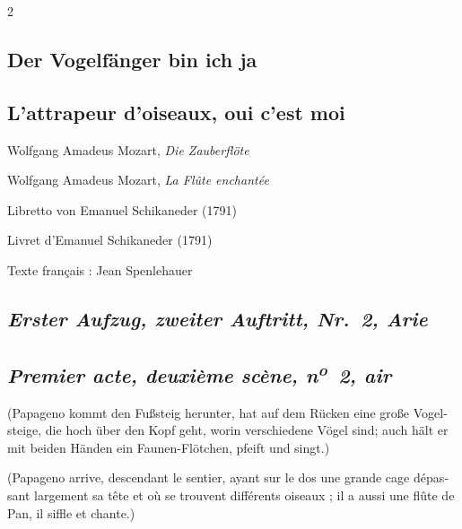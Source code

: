 \documentclass[a4paper,12pt]{article}
\newcommand\chunks[2]{%
\begin{leftcolumn*}\begin{otherlanguage}{german}%
{#1}%
\end{otherlanguage}\end{leftcolumn*}%
\begin{rightcolumn}\begin{otherlanguage}{french}%
{#2}%
\end{otherlanguage}\end{rightcolumn}%
}
\newcommand\strophe[1]{\subsection*{\normalsize\normalfont\itshape #1}}
\begin{document}
\thispagestyle{empty}
\setlength{\columnsep}{8mm}


\begin{paracol}{2}

  \chunks{\section*{Der Vogelfänger bin ich ja}}
         {\section*{L’attrapeur d’oiseaux, oui c’est moi}}

  \chunks{\noindent\raggedright\small Wolfgang Amadeus Mozart, \textit{Die Zauberflöte}}
         {\noindent\raggedright\small Wolfgang Amadeus Mozart, \textit{La Flûte enchantée}}

  \chunks{\noindent\raggedright\small Libretto von Emanuel Schikaneder (1791)}
         {\noindent\raggedright\small Livret d’Emanuel Schikaneder (1791)}

  \chunks{}
         {\noindent\raggedright\small Texte français : Jean Spenlehauer}

  \chunks{\strophe{Erster Aufzug, zweiter Auftritt, Nr.~2, Arie}}
         {\strophe{Premier acte, deuxième scène, n\textsuperscript{o}~2, air}}

  \chunks{\noindent\small(Papageno kommt den Fußsteig herunter, hat auf dem Rücken eine große Vogelsteige, die hoch über den Kopf geht, worin verschiedene Vögel sind; auch hält er mit beiden Händen ein Faunen-Flötchen, pfeift und singt.)}
         {\noindent\small(Papageno arrive, descendant le sentier, ayant sur le dos une grande cage dépassant largement sa tête et où se trouvent différents oiseaux ; il a aussi une flûte de Pan, il siffle et chante.)}


\end{paracol}
\end{document}
